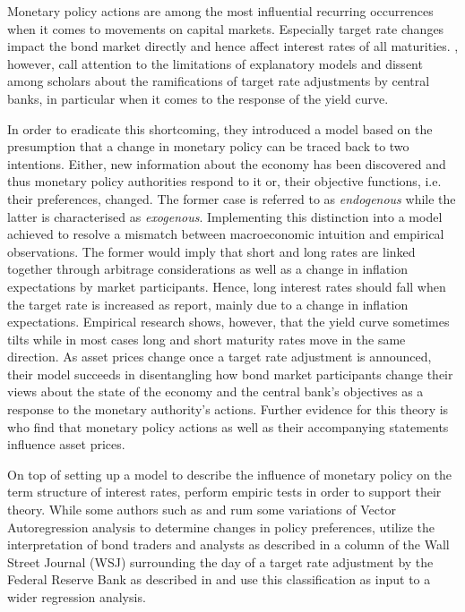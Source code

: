 
Monetary policy actions are among the most influential recurring occurrences when it comes to movements on capital markets. Especially target rate changes impact the bond market directly and hence affect interest rates of all maturities. \textcite{Ellingsen.2001}, however, call attention to the limitations of explanatory models and dissent among scholars about the ramifications of target rate adjustments by central banks, in particular when it comes to the response of the yield curve. 

In order to eradicate this shortcoming, they introduced a model based on the presumption that a change in monetary policy can be traced back to two intentions. Either, new information about the economy has been discovered and thus monetary policy authorities respond to it or, their objective functions, i.e. their preferences, changed. The former case is referred to as \textit{endogenous} while the latter is characterised as \textit{exogenous}.
Implementing this distinction into a model achieved to resolve a mismatch between macroeconomic intuition and empirical observations. The former would imply that short and long rates are linked together through arbitrage considerations as well as a change in inflation expectations by market participants. Hence, long interest rates should fall when the target rate is increased as \textcite{Ellingsen.2003} report, mainly due to a change in inflation expectations. Empirical research shows, however, that the yield curve sometimes tilts while in most cases long and short maturity rates move in the same direction. As asset prices change once a target rate adjustment is announced, their model succeeds in disentangling how bond market participants change their views about the state of the economy and the central bank's objectives as a response to the monetary authority's actions. Further evidence for this theory is \textcite{Gurkaynak.2004} who find that monetary policy actions as well as their accompanying statements influence asset prices.

On top of setting up a model to describe the influence of monetary policy on the term structure of interest rates, \textcite{Ellingsen.2001} perform empiric tests in order to support their theory. While some authors such as \textcite{Peersman.2002} and \textcite{Evans.1998} rum some variations of Vector Autoregression analysis to determine changes in policy preferences, \textcite{Ellingsen.2001} utilize the interpretation of bond traders and analysts as described in a column of the Wall Street Journal (WSJ) surrounding the day of a target rate adjustment by the Federal Reserve Bank as described in \textcite{Ellingsen.2003} and use this classification as input to a wider regression analysis.

